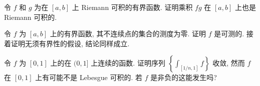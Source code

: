 \documentclass[../../main.tex]{subfiles}
\begin{document}
\begin{exercise}\label{exercise:ch05-15}
令 $f$ 和 $g$ 为在 $[a,b]$ 上 Riemann 可积的有界函数. 证明乘积 $fg$ 在 $[a,b]$ 上也是 Riemann 可积的.
\end{exercise}

\begin{exercise}\label{exercise:ch05-16}
令 $f$ 为 $[a,b]$ 上的有界函数, 其不连续点的集合的测度为零. 证明 $f$ 是可测的. 接着证明无须有界性的假设, 结论同样成立.
\end{exercise}

\begin{exercise}\label{exercise:ch05-17}
令 $f$ 为 $[0,1]$ 上的在 $(0,1]$ 上连续的函数. 证明序列 $\left\{\int_{[1/n,1]}f\right\}$ 收敛, 然而 $f$ 在 $[0,1]$ 上有可能不是 Lebesgue 可积的. 若 $f$ 是非负的这能发生吗?
\end{exercise}
\end{document}
